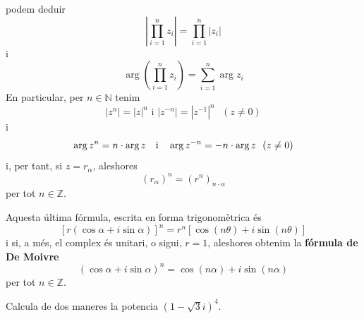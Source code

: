 podem deduir
\begin{equation*}
\left\vert \displaystyle\prod\limits_{i=1}^{n}z_{i}\right\vert
=\displaystyle\prod\limits_{i=1}^{n}\left\vert z_{i}\right\vert
\end{equation*}
i
\begin{equation*}
\arg \left( \displaystyle\prod\limits_{i=1}^{n}z_{i}\right) =\displaystyle\sum\limits_{i=1}^{n}\arg
z_{i}
\end{equation*}
En particular, per $n\in \mathbb{N}$ tenim
\begin{equation*}
\left\vert z^{n}\right\vert =\left\vert z\right\vert ^{n}\text{ \ \ i \ \ }
\left\vert z^{-n}\right\vert =\left\vert z^{-1}\right\vert ^{n}\text{ \ }
(z\neq 0)
\end{equation*}
i
\begin{equation*}
\arg z^{n}=n\cdot \arg z\text{ \ \ i \ \ }\arg z^{-n}=-n\cdot \arg z\text{ \
}(z\neq 0)
\end{equation*}
i, per tant, si $z=r_{\alpha }$, aleshores
\begin{equation*}
\left( r_{\alpha }\right) ^{n}=\left( r^{n}\right) _{n\cdot \alpha }
\end{equation*}
per tot $n\in \mathbb{Z}$.

Aquesta última fórmula, escrita en forma trigonomètrica és
\begin{equation*}
\left[ r(\cos \alpha +i\sin \alpha )\right] ^{n}=r^{n}\left[ \cos (n\theta
)+i\sin (n\theta )\right]
\end{equation*}
i si, a més, el complex és unitari, o sigui, $r=1$, aleshores obtenim
la \textbf{fórmula de De Moivre}
\begin{equation*}
(\cos \alpha +i\sin \alpha )^{n}=\cos (n\alpha )+i\sin (n\alpha )
\end{equation*}
per tot $n\in \mathbb{Z}$.

\begin{exemple}
Calcula de dos maneres la potencia $(1-\sqrt{3}i)^{4}$.
\end{exemple}

